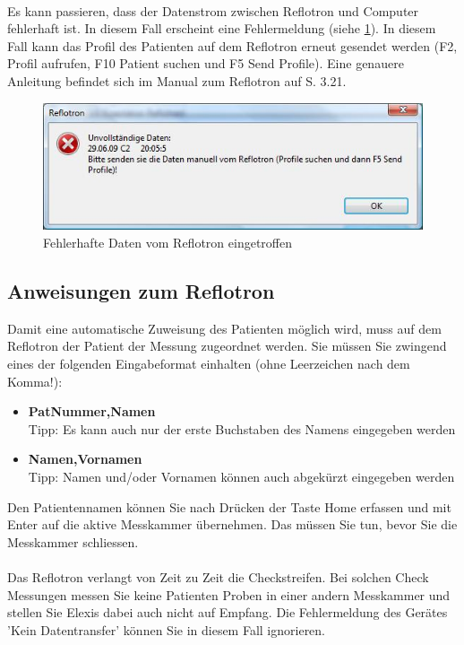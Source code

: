 \documentclass[a4paper]{scrartcl}
\begin{document}
\\
Es kann passieren, dass der Datenstrom zwischen Reflotron und Computer fehlerhaft ist. In diesem Fall erscheint eine Fehlermeldung (siehe \ref{fig:transmissionerror}). In diesem Fall kann das Profil des Patienten auf dem Reflotron erneut gesendet werden (F2, Profil aufrufen, F10 Patient suchen und F5 Send Profile). Eine genauere Anleitung befindet sich im Manual zum Reflotron auf S. 3.21.
\begin{figure}[h]
    \includegraphics{transmissionerror}
    \caption{Fehlerhafte Daten vom Reflotron eingetroffen}
    \label{fig:transmissionerror}
\end{figure}
\subsection{Anweisungen zum Reflotron}
Damit eine automatische Zuweisung des Patienten m\"oglich wird, muss auf dem Reflotron der Patient der Messung zugeordnet werden. Sie m\"ussen Sie zwingend eines der folgenden Eingabeformat einhalten (ohne Leerzeichen nach dem Komma!):\\
\begin{itemize}
\item \textbf{PatNummer,Namen}\\Tipp: Es kann auch nur der erste Buchstaben des Namens eingegeben werden
\item \textbf{Namen,Vornamen}\\Tipp: Namen und/oder Vornamen k\"onnen auch abgek\"urzt eingegeben werden
\end{itemize}
Den Patientennamen k\"onnen Sie nach Dr\"ucken der Taste Home erfassen und mit Enter auf die aktive Messkammer \"ubernehmen. Das m\"ussen Sie tun, bevor Sie die Messkammer schliessen.\\
\\
Das Reflotron verlangt von Zeit zu Zeit die Checkstreifen. Bei solchen Check Messungen messen Sie keine Patienten Proben in einer andern Messkammer und stellen Sie Elexis dabei auch nicht auf Empfang. Die Fehlermeldung des Ger\"ates 'Kein Datentransfer'  k\"onnen Sie in diesem Fall ignorieren.
\end{document}
